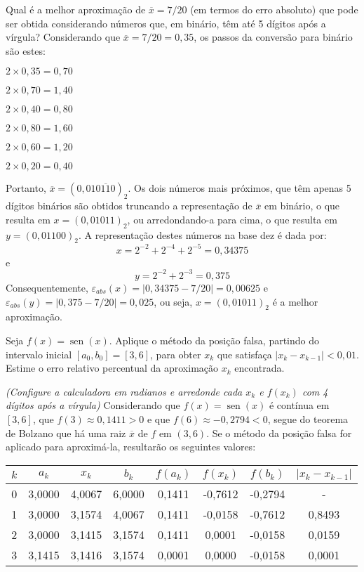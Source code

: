 \documentclass[12pt,a4paper]{article}
\newcommand*\sen{\operatorname{sen}}
\begin{document}
\begin{ExerciseList}
\Exercise[title={2,5}] Qual é a melhor aproximação de $\overline{x} = 7/20$ (em termos do erro absoluto) que pode ser obtida considerando números que, em binário, têm até 5 dígitos após a vírgula?
\Answer Considerando que $\overline{x} = 7/20 = 0,35$, os passos da conversão para binário são estes:
\begin{description}
\item $2 \times 0,35 = 0,70$
\item $2 \times 0,70 = 1,40$
\item $2 \times 0,40 = 0,80$
\item $2 \times 0,80 = 1,60$
\item $2 \times 0,60 = 1,20$
\item $2 \times 0,20 = 0,40$
\end{description}
Portanto, $\overline{x} = (0,01\overline{0110})_2$. Os dois números mais próximos, que têm apenas 5 dígitos binários são obtidos truncando a representação de $\overline{x}$ em binário, o que resulta em $x = (0,01011)_2$, ou arredondando-a para cima, o que resulta em $y = (0,01100)_2$. A representação destes números na base dez é dada por:
\[
x = 2^{-2}+2^{-4}+2^{-5} = 0,34375
\]
e
\[
y = 2^{-2}+2^{-3} = 0,375
\]
Consequentemente, $\varepsilon_{abs}(x) = |0,34375 - 7/20| = 0,00625$ e $\varepsilon_{abs}(y) = |0,375 - 7/20| = 0,025$, ou seja, $x = (0,01011)_2$ é a melhor aproximação.

\Exercise[title={2,5}]
Seja $f(x) = \sen(x)$. Aplique o método da posição falsa, partindo do intervalo inicial $[a_0, b_0] = [3, 6]$, para obter $x_k$ que satisfaça $|x_k-x_{k-1}| < 0,01$. Estime o erro relativo percentual da aproximação $x_k$ encontrada.

\textit{(Configure a calculadora em radianos e arredonde cada $x_k$ e $f(x_k)$ com 4 dígitos após a vírgula)}
\Answer Considerando que $f(x) = \sen(x)$ é contínua em $[3, 6]$, que $f(3) \approx 0,1411 > 0$ e que $f(6) \approx -0,2794 < 0$, segue do teorema de Bolzano que há uma raiz $\overline{x}$ de $f$ em $(3, 6)$. Se o método da posição falsa for aplicado para aproximá-la, resultarão os seguintes valores:

\begin{center}
\begin{tabular}{cccccccc}
\hline 
$k$ & $a_k$ & $x_k$ & $b_k$ & $f(a_k)$ & $f(x_k)$ & $f(b_k)$ & $|x_k-x_{k-1}|$ \\
\hline
0 & 3,0000 & 4,0067 & 6,0000 & 0,1411 & -0,7612 & -0,2794 & - \\
1 & 3,0000 & 3,1574 & 4,0067 & 0,1411 & -0,0158 & -0,7612 & 0,8493 \\
2 & 3,0000 & 3,1415 & 3,1574 & 0,1411 &  0,0001 & -0,0158 & 0,0159 \\
3 & 3,1415 & 3,1416 & 3,1574 & 0,0001 &  0,0000 & -0,0158 & 0,0001 \\
\hline 
\end{tabular}
\end{center}


\end{ExerciseList}
\end{document}
